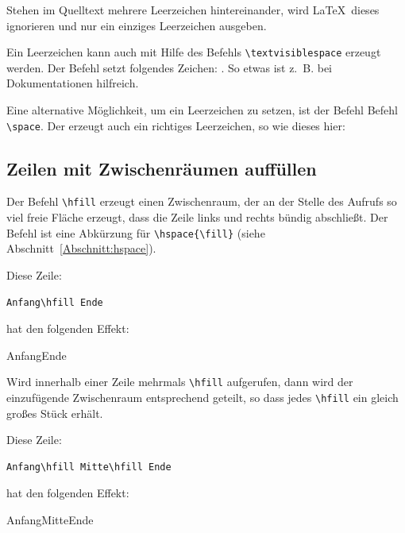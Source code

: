 \documentclass[a4paper,10pt,twoside]{scrbook}
\begin{document}
Stehen im Quelltext mehrere Leerzeichen hintereinander, wird 
\LaTeX\ dieses ignorieren und nur ein einziges Leerzeichen ausgeben.


Ein Leerzeichen kann auch mit Hilfe des Befehls 
\verb!\textvisiblespace! 
erzeugt werden. Der Befehl setzt folgendes Zeichen:
\glqq\textvisiblespace\grqq. So etwas ist z.~B. bei 
Dokumentationen hilfreich.


Eine alternative Möglichkeit, um ein Leerzeichen zu setzen, ist der Befehl 
Befehl \verb!\space!. Der erzeugt auch ein richtiges Leerzeichen, so wie dieses hier: \glqq\space\grqq


\subsection{Zeilen mit Zwischenräumen auffüllen}
\label{AbschnittZeilenAuffuellen}

Der Befehl \verb!\hfill! erzeugt einen Zwischenraum, der an der Stelle des Aufrufs so
viel freie Fläche erzeugt, dass die Zeile links und rechts bündig
abschließt. Der Befehl ist
eine Abkürzung für \verb!\hspace{\fill}! (siehe Abschnitt~\ref{Abschnitt:hspace}).


Diese Zeile:

\begin{Verbatim}[frame=single]
Anfang\hfill Ende
\end{Verbatim}

hat den folgenden Effekt:

Anfang\hfill Ende

Wird innerhalb einer Zeile mehrmals \verb!\hfill! aufgerufen, dann wird der
einzufügende Zwischenraum entsprechend geteilt, so dass jedes \verb!\hfill! ein
gleich großes Stück erhält. 

Diese Zeile:

\begin{Verbatim}[frame=single]
Anfang\hfill Mitte\hfill Ende
\end{Verbatim}

hat den folgenden Effekt:

Anfang\hfill Mitte\hfill Ende
\end{document}
